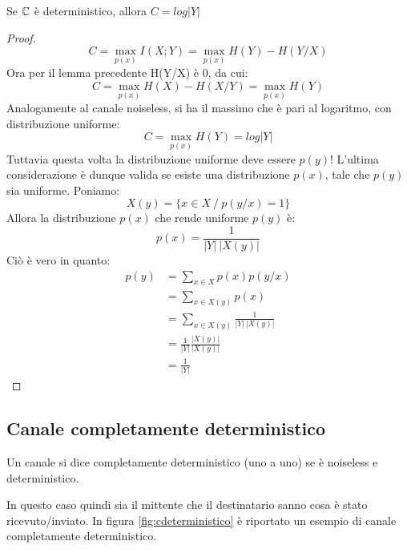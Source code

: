 \begin{lemma}
Se $\mathbb{C}$ è deterministico, allora $C=log|Y|$
\begin{proof}
 \[
  C=\max_{p(x)} I(X;Y)=\max_{p(x)} H(Y)-H(Y/X)
 \]
 Ora per il lemma precedente H(Y/X) è 0, da cui:
 \[
  C=\max_{p(x)} H(X)-H(X/Y)=\max_{p(x)} H(Y)
 \]
 Analogamente al canale noiseless, si ha il massimo che è pari al logaritmo, con distribuzione uniforme:
 \[
  C=\max_{p(x)} H(Y)=log|Y|
 \]
 Tuttavia questa volta la distribuzione uniforme deve essere $p(y)$!
 L'ultima considerazione è dunque valida se esiste una distribuzione $p(x)$, tale che $p(y)$ sia uniforme.
 Poniamo:
 \[
  X(y)=\{x \in X \ / \ p(y/x)=1 \}
 \]
 Allora la distribuzione $p(x)$ che rende uniforme $p(y)$ è:
 \[
  p(x)=\frac{1}{|Y| \ |X(y)|}
 \]
 Ciò è vero in quanto:
 \[\begin{split}
  p(y)&=\sum_{x \in X}p(x)p(y/x) \\
      &=\sum_{x \in X(y)}p(x) \\
      &=\sum_{x \in X(y)}\frac{1}{|Y| \ |X(y)|} \\
      &=\frac{1}{|Y|} \frac{|X(y)|}{|X(y)|} \\
      &=\frac{1}{|Y|}
   \end{split}
 \]

\end{proof}
\end{lemma}


\subsection{Canale completamente deterministico}

\medskip

\begin{definizione}
 Un canale si dice completamente deterministico (uno a uno) se è noiseless e deterministico.
\end{definizione}

In questo caso quindi sia il mittente che il destinatario sanno cosa è stato ricevuto/inviato.
In figura \ref{fig:cdeterministico} è riportato un esempio di canale completamente deterministico.

